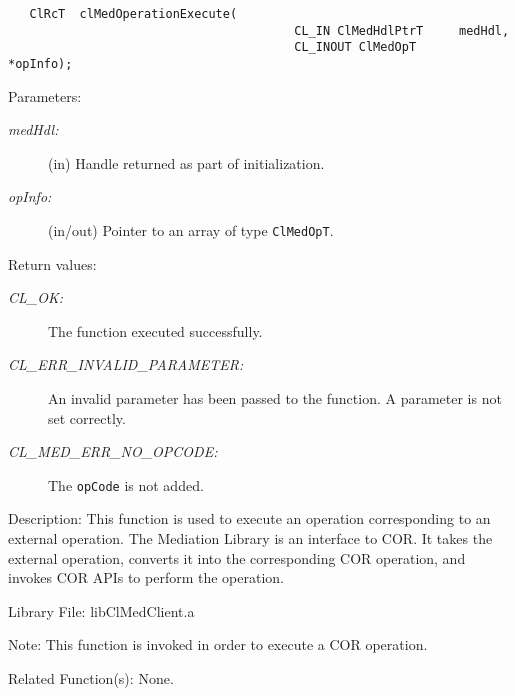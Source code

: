 \begin{flushleft}
\begin{Desc}
\footnotesize\begin{verbatim}   ClRcT  clMedOperationExecute(
                                  		CL_IN ClMedHdlPtrT     medHdl,
                                  		CL_INOUT ClMedOpT      *opInfo);
\end{verbatim}
\normalsize
\end{Desc}
\begin{Desc}
\item[Parameters:]
\begin{description}
\item[{\em med\-Hdl:}](in) Handle returned as part of initialization. 
\item[{\em op\-Info:}](in/out) Pointer to an array of type 
{\tt{ClMedOpT}}.\end{description}
\end{Desc}
\begin{Desc}
\item[Return values:]
\begin{description}
\item[{\em CL\_\-OK:}]The function executed successfully. 
\item[{\em CL\_\-ERR\_\-INVALID\_\-PARAMETER:}]An invalid parameter has been passed to the function. A parameter is not set correctly. 
\item[{\em CL\_\-MED\_\-ERR\_\-NO\_\-OPCODE:}]The {\tt{op\-Code}} is not added.\end{description}
\end{Desc}
\begin{Desc}
\item[Description:]This function is used to execute an operation corresponding to an external operation. The Mediation Library is an interface to COR. It 
takes the external operation, converts it into the corresponding COR operation, and invokes COR APIs to perform the operation. 
\end{Desc}
\begin{Desc}
\item[Library File:]lib\-Cl\-Med\-Client.a\end{Desc}
\begin{Desc}
\item[Note:]This function is invoked in order to execute a COR operation.\end{Desc}
\begin{Desc}
\item[Related Function(s):]None. \end{Desc}
\newpage



\end{flushleft}
